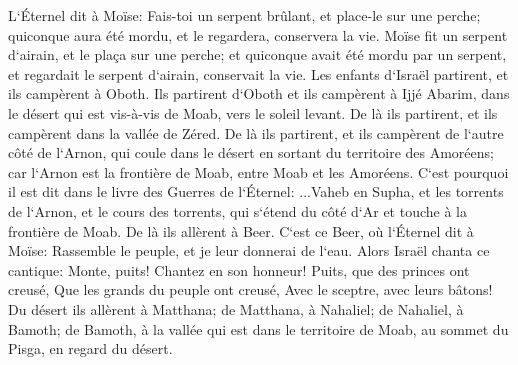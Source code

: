 \verse L`Éternel dit à Moïse: Fais-toi un serpent brûlant, et place-le sur une perche; quiconque aura été mordu, et le regardera, conservera la vie. 
\verse Moïse fit un serpent d`airain, et le plaça sur une perche; et quiconque avait été mordu par un serpent, et regardait le serpent d`airain, conservait la vie. 
\verse Les enfants d`Israël partirent, et ils campèrent à Oboth. 
\verse Ils partirent d`Oboth et ils campèrent à Ijjé Abarim, dans le désert qui est vis-à-vis de Moab, vers le soleil levant. 
\verse De là ils partirent, et ils campèrent dans la vallée de Zéred. 
\verse De là ils partirent, et ils campèrent de l`autre côté de l`Arnon, qui coule dans le désert en sortant du territoire des Amoréens; car l`Arnon est la frontière de Moab, entre Moab et les Amoréens. 
\verse C`est pourquoi il est dit dans le livre des Guerres de l`Éternel: ...Vaheb en Supha, et les torrents de l`Arnon, 
\verse et le cours des torrents, qui s`étend du côté d`Ar et touche à la frontière de Moab. 
\verse De là ils allèrent à Beer. C`est ce Beer, où l`Éternel dit à Moïse: Rassemble le peuple, et je leur donnerai de l`eau. 
\verse Alors Israël chanta ce cantique: Monte, puits! Chantez en son honneur! 
\verse Puits, que des princes ont creusé, Que les grands du peuple ont creusé, Avec le sceptre, avec leurs bâtons! 
\verse Du désert ils allèrent à Matthana; de Matthana, à Nahaliel; de Nahaliel, à Bamoth; 
\verse de Bamoth, à la vallée qui est dans le territoire de Moab, au sommet du Pisga, en regard du désert. 
